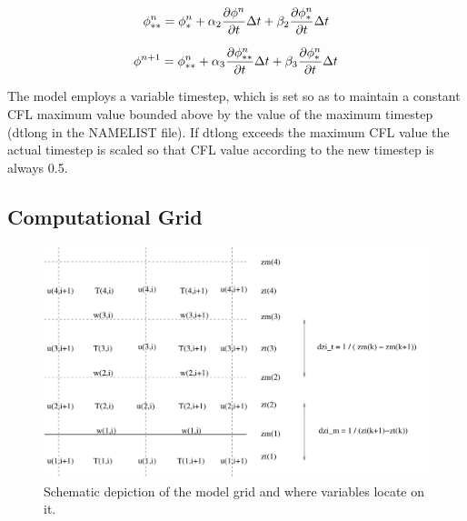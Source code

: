 \documentclass[11pt,a4paper]{article}
\begin{document}
\begin{equation}
	\phi_{**}^{n} = \phi_*^{n} + \alpha_2 \frac{\partial \phi^{n}}{\partial t} \Delta t + \beta_2 \frac{\partial \phi_*^{n}}{\partial t} \Delta t\\
	\label{eq:phi2}
\end{equation}

\begin{equation}
	\phi^{n+1} = \phi_{**}^{n} + \alpha_3 \frac{\partial \phi_{**}^{n}}{\partial t} \Delta t + \beta_3 \frac{\partial \phi_*^{n}}{\partial t} \Delta t\\
	\label{eq:phi3}
\end{equation}

The model employs a variable timestep, which is set so as to maintain
a constant CFL maximum value bounded above by the value of the maximum
timestep (dtlong in the NAMELIST file). If dtlong exceeds the maximum
CFL value the actual timestep is scaled so that CFL value according
to the new timestep is always 0.5.

\subsection{Computational Grid}
\begin{figure}[htb]
\centering \leavevmode \includegraphics[width=12cm]{grid2}
\caption{Schematic depiction of the model grid and where variables
locate on it.}
\label{fig:grid}
\end{figure}
\end{document}
